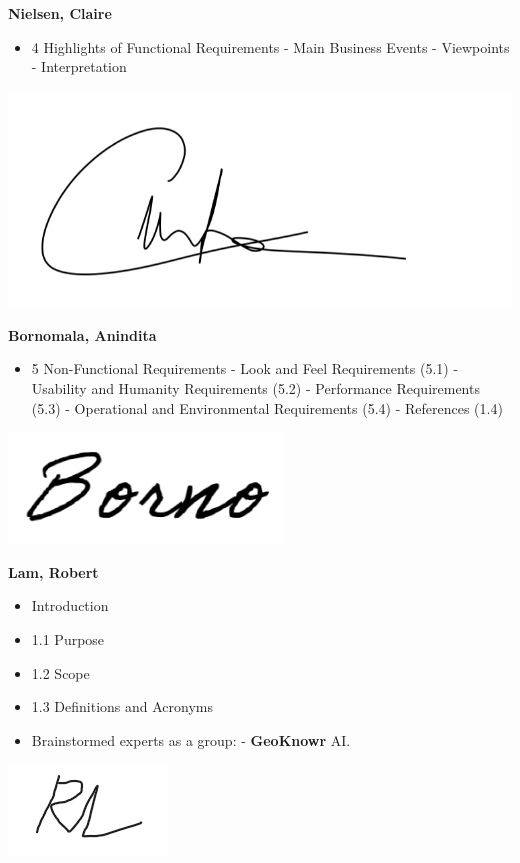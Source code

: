\documentclass[]{article}
\begin{document}
\textbf{Nielsen, Claire}
\begin{itemize}
        \item 4 Highlights of Functional Requirements
            \subitem - Main Business Events
            \subitem - Viewpoints
            \subitem - Interpretation
\end{itemize}
\includegraphics[scale=0.15]{clairesignature.jpg}

\textbf{Bornomala, Anindita}
\begin{itemize}
        \item 5 Non-Functional Requirements
            \subitem - Look and Feel Requirements (5.1)
            \subitem - Usability and Humanity Requirements (5.2)
            \subitem - Performance Requirements (5.3)
            \subitem - Operational and Environmental Requirements (5.4)
            \subitem - References (1.4)
\end{itemize}
\includegraphics[scale=0.50]{bornosignature.png}

\textbf{Lam, Robert}
\begin{itemize}
        \item Introduction
        \item 1.1 Purpose
        \item 1.2 Scope
        \item 1.3 Definitions and Acronyms
        \item Brainstormed experts as a group:
		    \subitem - \textbf{GeoKnowr} AI.
\end{itemize}
\includegraphics[scale=1]{robertsignature.png}
\end{document}
